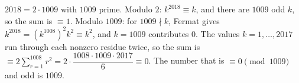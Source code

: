 $2018=2\cdot1009$ with $1009$ prime. Modulo $2$: $k^{2018}\equiv k$, and there are $1009$ odd $k$, so the sum is $\equiv1$. Modulo $1009$: for $1009\nmid k$, Fermat gives $k^{2018}=(k^{1008})^2k^2\equiv k^2$, and $k=1009$ contributes $0$. The values $k=1,\dots,2017$ run through each nonzero residue twice, so the sum is $\equiv2\sum_{r=1}^{1008}r^2=2\cdot\dfrac{1008\cdot1009\cdot2017}6\equiv0$. The number that is $\equiv0\pmod{1009}$ and odd is $\boxed{1009}$.
